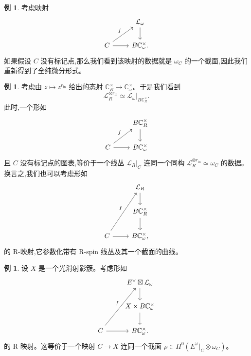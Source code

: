 \documentclass{amsart}
\theoremstyle{definition}
\newtheorem{exm}[thm]{例}
\theoremstyle{remark}
\theoremstyle{plain}
\theoremstyle{definition}
\theoremstyle{remark}
\newcommand{\C}{\mathbb{C}}
\newcommand{\mc}[1]{\mathcal{#1}}
\newcommand{\mr}[1]{\mathrm{#1}}
\newcommand{\1}{\mathbf{1}}
\newcommand{\2}{\mathbf{2}}
\newcommand{\3}{\mathbf{3}}
\begin{document}
\begin{exm}
    考虑映射
    \begin{equation*}
    \begin{tikzcd}
        & \mc{L}_{\omega} \ar{d} \\
        C \ar{ur}{f} \ar{r} & B \C_{\omega}^{\times}.
    \end{tikzcd}
    \end{equation*}
    如果假设 \(C\) 没有标记点,那么我们看到该映射的数据就是 \(\omega_C\) 的一个截面,因此我们重新得到了全纯微分形式。
\end{exm}

\begin{exm}
    考虑由 \(z \mapsto z^{r_{\mr{in}}}\) 给出的态射 \(\C^{\times}_R \to \C^{\times}_{\omega}\)。于是我们看到
    \[ \mc{L}_R^{\otimes r_{\mr{in}}} \simeq \mc{L}_{\omega} |_{B \C_R^{\times}}. \]
    此时,一个形如
    \begin{equation*}
    \begin{tikzcd}
        & B \C_R^{\times} \ar{d} \\
        C \ar{ur}{f} \ar{r} & B \C_{\omega}^{\times}
    \end{tikzcd}
    \end{equation*}
    且 \(C\) 没有标记点的图表,等价于一个线丛 \(\mc{L}_R|_C\) 连同一个同构 \(\mc{L}_R^{\otimes r_{\mr{in}}} \simeq \omega_C\) 的数据。换言之,我们也可以考虑形如
    \begin{equation*}
    \begin{tikzcd}
        & \mc{L}_R \ar{d} \\
        & B \C_R^{\times} \ar{d} \\
        C \ar{uur}{f} \ar{r} & B \C_{\omega}^{\times},
    \end{tikzcd}
    \end{equation*}
    的 R-映射,它参数化带有 R-spin 线丛及其一个截面的曲线。
\end{exm}

\begin{exm}
    设 \(X\) 是一个光滑射影簇。考虑形如
    \begin{equation*}
    \begin{tikzcd}
        & E^{\vee} \boxtimes \mc{L}_{\omega} \ar{d} \\
        & X \times B \C_{\omega}^{\times} \ar{d} \\
        C \ar{uur}{f} \ar{r} & B \C_{\omega}^{\times}.
    \end{tikzcd}
    \end{equation*}
    的 R-映射。这等价于一个映射 \(C \to X\) 连同一个截面 \(\rho \in H^0(E^{\vee}|_C \otimes \omega_C)\)。
\end{exm}
\end{document}
